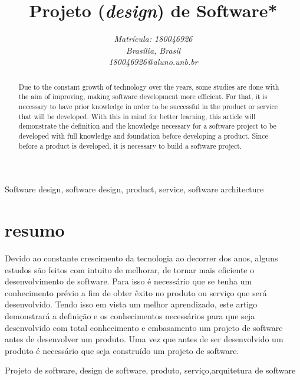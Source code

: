 \documentclass[conference]{IEEEtran}
\begin{document}
\title{Projeto (\textit{design}) de Software*\\
}

\author{
\textit{Matrícula: 180046926}\\
\textit{Brasília, Brasil} \\
\textit{180046926@aluno.unb.br}}



\maketitle

\begin{abstract}Due to the constant growth of technology over the years, some studies are done with the aim of improving, making software development more efficient. For that, it is necessary to have prior knowledge in order to be successful in the product or service that will be developed. With this in mind for better learning, this article will demonstrate the definition and the knowledge necessary for a software project to be developed with full knowledge and foundation before developing a product. Since before a product is developed, it is necessary to build a software project.

\end{abstract}

\begin{IEEEkeywords}
Software design, software design, product, service,
software architecture

\end{IEEEkeywords}

\section{resumo} Devido ao constante crescimento da tecnologia ao decorrer dos anos, alguns estudos são feitos com intuito de melhorar, de tornar mais eficiente o desenvolvimento de software. Para isso é necessário que se tenha um conhecimento prévio a fim de obter êxito no produto ou serviço que será desenvolvido. Tendo isso em vista um melhor aprendizado, este artigo demonstrará a definição e os conhecimentos necessários para que seja desenvolvido com total conhecimento e embasamento um projeto de software antes de desenvolver um produto. Uma vez que antes de ser desenvolvido um produto é necessário que seja construído um projeto de software.

\begin{IEEEkeywords}
Projeto de software, design de software, produto, serviço,arquitetura de software
\end{IEEEkeywords}
\end{document}
